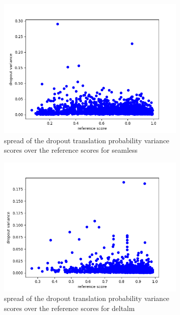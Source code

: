 \begin{figure}[h]
\begin{subfigure}{0.4\linewidth}
        \includegraphics[width=\textwidth]{Latex/sections/images/seamlessdropoutvariance.png}
        \caption{spread of the dropout translation probability variance scores over the reference scores for seamless}
    \end{subfigure}
    \begin{subfigure}{0.4\linewidth}
        \includegraphics[width=\textwidth]{Latex/sections/images/dlmdropoutvariance.png}
        \caption{spread of the dropout translation probability variance scores over the reference scores for deltalm}
    \end{subfigure}
    \begin{subfigure}{0.4\linewidth}

\end{subfigure}
\end{figure}
